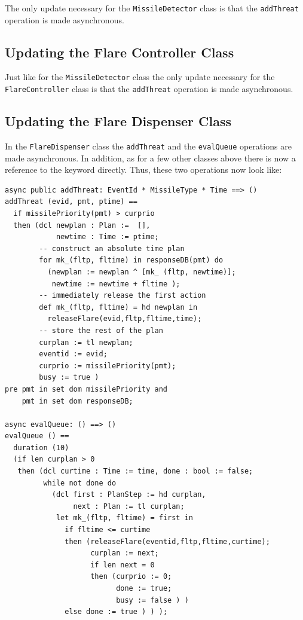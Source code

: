 \documentclass{overturerepchap}
\begin{document}
The only update necessary for the \texttt{MissileDetector} class is that
the \texttt{addThreat} operation is made asynchronous.

\subsection{Updating the Flare Controller Class}

Just like for the \texttt{MissileDetector} class the only update
necessary for the \texttt{FlareController} class is that the
\texttt{addThreat} operation is made asynchronous.

\subsection{Updating the Flare Dispenser Class}

In the \texttt{FlareDispenser} class the \texttt{addThreat} and the 
\texttt{evalQueue} operations are made asynchronous. In addition, as
for a few other classes above there is now a reference to the 
{\bf{}} keyword directly. Thus, these two operations now look
like:

\begin{lstlisting}
async public addThreat: EventId * MissileType * Time ==> ()
addThreat (evid, pmt, ptime) ==
  if missilePriority(pmt) > curprio
  then (dcl newplan : Plan :=  [],
            newtime : Time := ptime;
        -- construct an absolute time plan
        for mk_(fltp, fltime) in responseDB(pmt) do
          (newplan := newplan ^ [mk_ (fltp, newtime)];
           newtime := newtime + fltime );
        -- immediately release the first action
        def mk_(fltp, fltime) = hd newplan in
          releaseFlare(evid,fltp,fltime,time);
        -- store the rest of the plan
        curplan := tl newplan;
        eventid := evid;
        curprio := missilePriority(pmt);
        busy := true )
pre pmt in set dom missilePriority and
    pmt in set dom responseDB;

async evalQueue: () ==> ()
evalQueue () ==
  duration (10)
  (if len curplan > 0
   then (dcl curtime : Time := time, done : bool := false;
         while not done do
           (dcl first : PlanStep := hd curplan,
                next : Plan := tl curplan;
            let mk_(fltp, fltime) = first in
              if fltime <= curtime
              then (releaseFlare(eventid,fltp,fltime,curtime);
                    curplan := next;
                    if len next = 0
                    then (curprio := 0; 
                          done := true; 
                          busy := false ) )
              else done := true ) ) );
\end{lstlisting}
\end{document}
